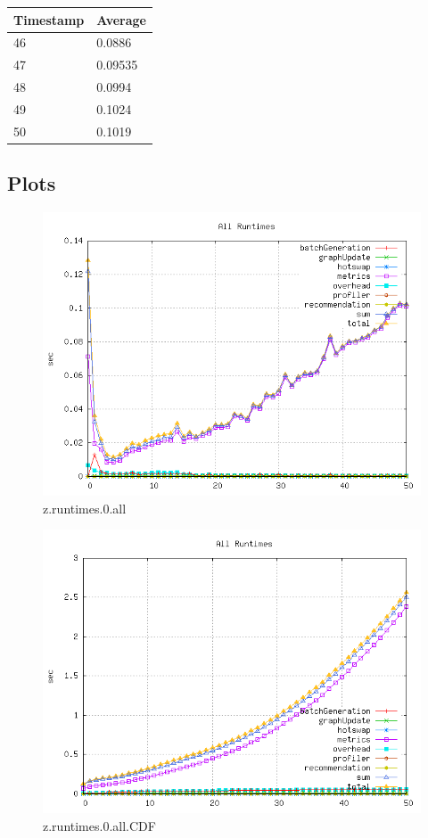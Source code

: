 \begin{tabular}{|l||l|}
\hline
	\textbf{Timestamp} & \textbf{Average} \\ \hline
	46 & 0.0886 \\ \hline
	47 & 0.09535 \\ \hline
	48 & 0.0994 \\ \hline
	49 & 0.1024 \\ \hline
	50 & 0.1019 \\ \hline
\end{tabular}

\subsection{Plots}

\begin{figure} [h]
	\centering
	\includegraphics [scale=0.8] {plots/z.runtimes.0.all}
	\caption{z.runtimes.0.all}
	\label{plot:RANDOM_100_500 - BARABASI_ALBERT_GROWTH_10_2.z.runtimes.0.all}
\end{figure}

\begin{figure} [h]
	\centering
	\includegraphics [scale=0.8] {plots/z.runtimes.0.all.CDF}
	\caption{z.runtimes.0.all.CDF}
	\label{plot:RANDOM_100_500 - BARABASI_ALBERT_GROWTH_10_2.z.runtimes.0.all.CDF}
\end{figure}

